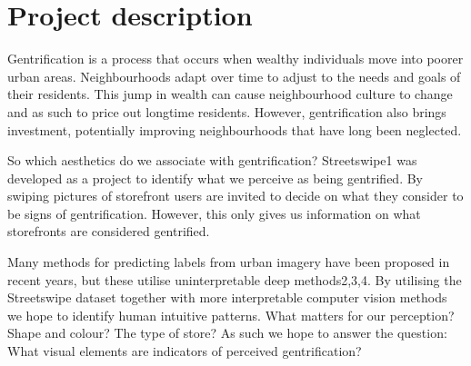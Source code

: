 \section{Project description}
\label{sec:proj_description}

Gentrification is a process that occurs when wealthy individuals move into poorer urban areas. Neighbourhoods adapt over time to adjust to the needs and goals of their residents. This jump in wealth can cause neighbourhood culture to change and as such to price out longtime residents. However, gentrification also brings investment, potentially improving neighbourhoods that have long been neglected. 

So which aesthetics do we associate with gentrification? Streetswipe1 was developed as a project to identify what we perceive as being gentrified. By swiping pictures of storefront users are invited to decide on what they consider to be signs of gentrification. However, this only gives us information on what storefronts are considered gentrified.

Many methods for predicting labels from urban imagery have been proposed in recent years, but these utilise uninterpretable deep methods2,3,4. By utilising the Streetswipe dataset together with more interpretable computer vision methods we hope to identify human intuitive patterns. What matters for our perception? Shape and colour? The type of store? As such we hope to answer the question: What visual elements are indicators of perceived gentrification?